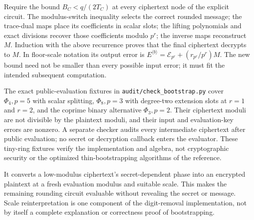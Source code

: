 Require the bound $B_C<q/(2T_C)$ at every ciphertext node of the explicit circuit. The modulus-switch inequality selects the correct rounded message; the trace-dual maps place its coefficients in scalar slots; the lifting polynomials and exact divisions recover those coefficients modulo $p^r$; the inverse maps reconstruct $M$. Induction with the above recurrence proves that the final ciphertext decrypts to $M$. In floor-scale notation its output error is $E^{\langle b\rangle}=\mathcal E_{p^r}+(r_{p^r}/p^r)M$. The new bound need not be smaller than every possible input error; it must fit the intended subsequent computation.

The exact public-evaluation fixtures in \texttt{audit/check\_bootstrap.py} cover $\Phi_4,p=5$ with scalar splitting, $\Phi_8,p=3$ with degree-two extension slots at $r=1$ and $r=2$, and the coprime binary alternative $\Phi_3,p=2$. Their ciphertext moduli are not divisible by the plaintext moduli, and their input and evaluation-key errors are nonzero. A separate checker audits every intermediate ciphertext after public evaluation; no secret or decryption callback enters the evaluator. These tiny-ring fixtures verify the implementation and algebra, not cryptographic security or the optimized thin-bootstrapping algorithms of the reference.

 It converts a low-modulus ciphertext's secret-dependent phase into an encrypted plaintext at a fresh evaluation modulus and suitable scale. This makes the remaining rounding circuit evaluable without revealing the secret or message. Scale reinterpretation is one component of the digit-removal implementation, not by itself a complete explanation or correctness proof of bootstrapping.

